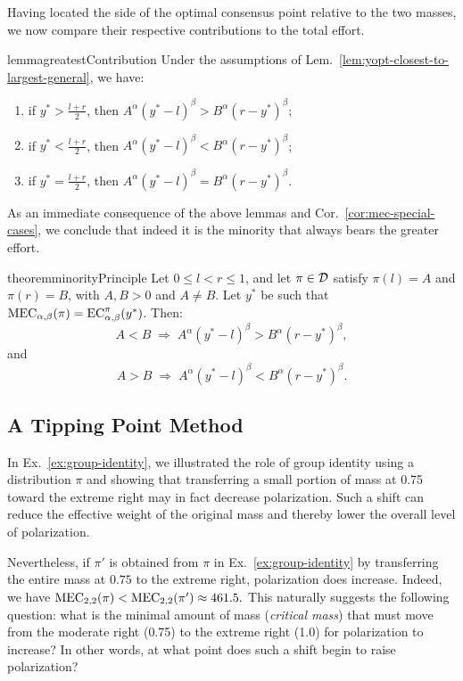 Having located the side of the optimal consensus point relative to the two masses, we now compare their respective contributions to the total effort.

\begin{restatable}{lemma}{greatestContribution}\label{lem:greatest-contribution-from-smallest-general}
Under the assumptions of Lem.~\ref{lem:yopt-closest-to-largest-general}, we have:
\begin{enumerate}
\item if \(y^*>\frac{l+r}{2}\), then \(A^\alpha (y^*-l)^\beta > B^\alpha (r-y^*)^\beta\);
\item if \(y^*<\frac{l+r}{2}\), then \(A^\alpha (y^*-l)^\beta < B^\alpha (r-y^*)^\beta\);
\item if \(y^*=\frac{l+r}{2}\), then \(A^\alpha (y^*-l)^\beta = B^\alpha (r-y^*)^\beta\).
\end{enumerate}
\end{restatable}

As an immediate consequence of the above lemmas and Cor.~\ref{cor:mec-special-cases}, we conclude that indeed it is the minority that always bears the greater effort.

\begin{restatable}{theorem}{minorityPrinciple}
\label{thm:minority-principle-general}
Let \(0\le l<r\le 1\), and let \(\pi\in\mathcal{D}\) satisfy \(\pi(l)=A\) and \(\pi(r)=B\), with \(A,B>0\) and \(A\neq B\). Let \(y^*\) be such that \(\MEC(\pi)=\EC[\alpha,\beta][\pi](y^*)\). Then:
\[
A<B \;\Longrightarrow\; A^\alpha (y^*-l)^\beta > B^\alpha (r-y^*)^\beta,
\]
and
\[
A>B \;\Longrightarrow\; A^\alpha (y^*-l)^\beta < B^\alpha (r-y^*)^\beta.
\]
\end{restatable}

\subsection{A Tipping Point Method}\label{sec:tipping-point} 

In Ex.~\ref{ex:group-identity}, we illustrated the role of group identity using a distribution $\pi$ and showing that transferring a small portion of mass at 0.75 toward the extreme right may in fact decrease polarization. Such a shift can reduce the effective weight of the original mass and thereby lower the overall level of polarization.

Nevertheless, if $\pi'$ is obtained from $\pi$ in Ex.~\ref{ex:group-identity} by transferring the entire mass
at $0.75$ to the extreme right, polarization does increase. Indeed, we have 
\(
\MEC[2,2](\pi)<\MEC[2,2](\pi') \approx 461.5 .
\)
This naturally suggests the following question: what is the minimal amount of
mass (\emph{critical mass}) that must move from the moderate right (0.75) to the extreme right (1.0) for
polarization to increase? In other words, at what point does such a shift begin
to raise polarization?

